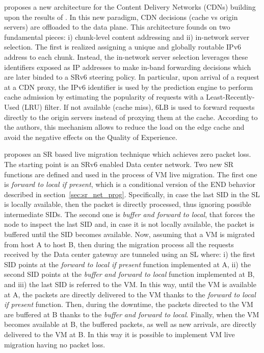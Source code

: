 \cite{desmouceaux2019content} proposes a new architecture for the Content Delivery Networks (CDNs) building upon the results of \cite{srlb}. In this new paradigm, CDN decisions (cache vs origin servers) are offloaded to the data plane. This architecture founds on two fundamental pieces: i) chunk-level content addressing and ii) in-network server selection. The first is realized assigning a unique and globally routable IPv6 address to each chunk. Instead, the in-network server selection leverages these identifiers exposed as IP addresses to make in-band forwarding decisions which are later binded to a SRv6 steering policy. In particular, upon arrival of a request at a CDN proxy, the IPv6 identifier is used by the prediction engine to perform cache admission by estimating the popularity of requests with a Least-Recently-Used (LRU) filter. If not available (cache miss), 6LB \cite{srlb} is used to forward requests directly to the origin servers instead of proxying them at the cache. According to the authors, this mechanism allows to reduce the load on the edge cache and avoid the negative effects on the Quality of Experience.

\cite{desmouceauxzero} proposes an SR based live migration technique which achieves zero packet loss.
The starting point is an SRv6 enabled Data center network.
Two new SR functions are defined and used in the process of VM live migration.
The first one is \emph{forward to local if present}, which is a conditional version of the END behavior described in section~\ref{sec:sr_net_prog}. Specifically, in case the last SID in the SL is locally available, then the packet is directly processed, thus ignoring possible intermediate SIDs.
The second one is \emph{buffer and forward to local}, that forces the node to inspect the last SID and, in case it is not locally available, the packet is buffered until the SID becomes available.
Now, assuming that a VM is migrated from host A to host B, then during the migration process all the requests received by the Data center gateway are tunneled using an SL where: i) the first SID points at the \emph{forward to local if present} function implemented at A, ii) the second SID points at the \emph{buffer and forward to local} function implemented at B, and iii) the last SID is referred to the VM.
In this way, until the VM is available at A, the packets are directly delivered to the VM thanks to the \emph{forward to local if present} function. Then, during the downtime, the packets directed to the VM are buffered at B thanks to the \emph{buffer and forward to local}. Finally, when the VM becomes available at B, the buffered packets, as well as new arrivals, are directly delivered to the VM at B.
In this way it is possible to implement VM live migration having no packet loss.

